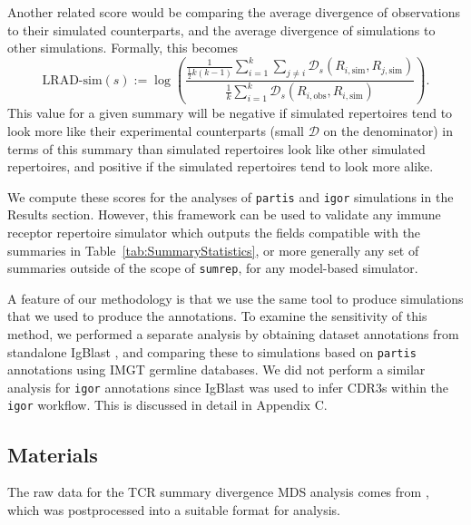 \documentclass{article}
\begin{document}
Another related score would be comparing the average divergence of observations to their simulated counterparts, and the average divergence of simulations to other simulations.
Formally, this becomes
\begin{equation}\label{eq:ScoreSim}
    \text{LRAD-sim}(s) :=
    \log \left(
        \frac{
            \frac{1}{\frac{1}{2} k\left(k - 1\right)}
            \sum_{i=1}^{k}
            \sum_{j \ne i}
                \mathcal D_s\left(R_{i, \text{sim}}, R_{j, \text{sim}}\right)
        }
        {
            \frac{1}{k}
            \sum_{i = 1}^k
                \mathcal D_s \left( R_{i, \text{obs}}, R_{i, \text{sim}}\right)
        }
    \right).
\end{equation}
This value for a given summary will be negative if simulated repertoires tend to look more like their experimental counterparts (small $\mathcal D$ on the denominator) in terms of this summary than simulated repertoires look like other simulated repertoires, and positive if the simulated repertoires tend to look more alike.

We compute these scores for the analyses of \texttt{partis} and \texttt{igor} simulations in the Results section.
However, this framework can be used to validate any immune receptor repertoire simulator which outputs the fields compatible with the summaries in Table~\ref{tab:SummaryStatistics}, or more generally any set of summaries outside of the scope of \texttt{sumrep}, for any model-based simulator.

A feature of our methodology is that we use the same tool to produce simulations that we used to produce the annotations.
To examine the sensitivity of this method, we performed a separate analysis by obtaining dataset annotations from standalone IgBlast \cite{Ye2013-kl}, and comparing these to simulations based on \texttt{partis} annotations using IMGT germline databases.
We did not perform a similar analysis for \texttt{igor} annotations since IgBlast was used to infer CDR3s within the \texttt{igor} workflow.
This is discussed in detail in Appendix C.


\subsection*{Materials}
The raw data for the TCR summary divergence MDS analysis comes from \cite{Pogorelyy2018-ak}, which was postprocessed into a suitable format for analysis.
\end{document}
